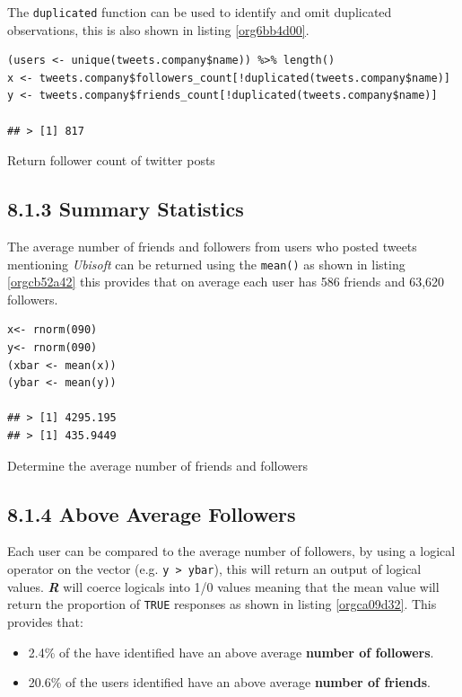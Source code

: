 \documentclass[11pt]{article}
\begin{document}
The \texttt{duplicated} function can be used to identify and omit duplicated observations, this is also shown in listing \ref{org6bb4d00}.

\begin{listing}[htbp]
\begin{verbatim}
(users <- unique(tweets.company$name)) %>% length()
x <- tweets.company$followers_count[!duplicated(tweets.company$name)]
y <- tweets.company$friends_count[!duplicated(tweets.company$name)]

## > [1] 817
\end{verbatim}
\caption{\label{org6bb4d00}Return follower count of twitter posts}
\end{listing}


\subsection{8.1.3 Summary Statistics}
\label{sec:orga18a3e9}
The average number of friends and followers from users who posted tweets mentioning \emph{Ubisoft} can be returned using the \texttt{mean()} as shown in listing \ref{orgcb52a42}
this provides that on average each user has 586 friends and 63,620 followers.

\begin{listing}[htbp]
\begin{verbatim}
x<- rnorm(090)
y<- rnorm(090)
(xbar <- mean(x))
(ybar <- mean(y))

## > [1] 4295.195
## > [1] 435.9449
\end{verbatim}
\caption{\label{orgcb52a42}Determine the average number of friends and followers}
\end{listing}

\subsection{8.1.4 Above Average Followers}
\label{sec:org4cf2e14}
Each user can be compared to the average number of followers, by using a logical
operator on the vector (e.g. \texttt{y > ybar}), this will return an output of logical
values. \textbf{\emph{R}} will coerce logicals into 1/0 values meaning that the mean value
will return the proportion of \texttt{TRUE} responses as shown in listing \ref{orgca09d32}. This
provides that:

\begin{itemize}
\item 2.4\%  of the have identified have an above average \textbf{number of followers}.
\item 20.6\% of the users identified have an above average \textbf{number of friends}.
\end{itemize}
\end{document}
